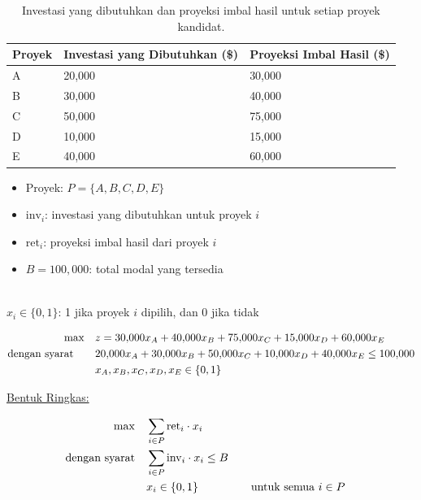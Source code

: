 \begin{table}[h!] \begin{center} \begin{tabular} {|l|l|l|} 
\hline Proyek & Investasi yang Dibutuhkan (\$) & Proyeksi Imbal Hasil (\$)  \\ \hline
\hline  A & 20,000 & 30,000  \\
\hline  B & 30,000 & 40,000  \\
\hline  C & 50,000 & 75,000  \\
\hline  D & 10,000 & 15,000  \\
\hline  E & 40,000 & 60,000  \\
\hline \end{tabular} \end{center} \caption{Investasi yang dibutuhkan dan proyeksi imbal hasil untuk setiap proyek kandidat.}\label{tab:modeling-linear-programming-tab05}%
\end{table}

\begin{solution}

\smallskip {}
\begin{itemize}
\item Proyek: \( P = \{A, B, C, D, E\} \)
\end{itemize}

\smallskip {}
\begin{itemize}
\item \( \text{inv}_i \): investasi yang dibutuhkan untuk proyek \( i \)
\item \( \text{ret}_i \): proyeksi imbal hasil dari proyek \( i \)
\item \( B = 100{,}000 \): total modal yang tersedia
\end{itemize}

\smallskip {} \\
\( x_i \in \{0,1\} \): 1 jika proyek \( i \) dipilih, dan 0 jika tidak

\smallskip {}
\begin{align*}
\max \quad & z = 30{,}000x_A + 40{,}000x_B + 75{,}000x_C + 15{,}000x_D + 60{,}000x_E \\
\mbox{dengan syarat}\quad \quad 
& 20{,}000x_A + 30{,}000x_B + 50{,}000x_C + 10{,}000x_D + 40{,}000x_E \le 100{,}000 \\
& x_A, x_B, x_C, x_D, x_E \in \{0,1\}
\end{align*}

\smallskip \underline{Bentuk Ringkas:}

\begin{align*}
\max \quad & \sum_{i \in P} \mbox{ret}_i \cdot x_i \\
\mbox{dengan syarat}\quad        & \sum_{i \in P} \mbox{inv}_i \cdot x_i \le B \\
& x_i \in \{0,1\} &&\quad \mbox{untuk semua } i \in P
\end{align*}

\end{solution}

